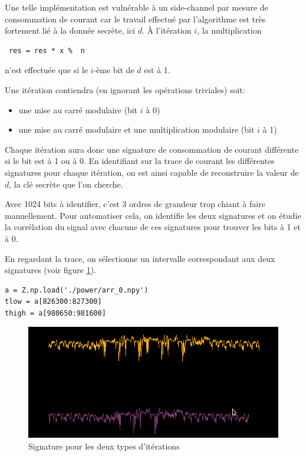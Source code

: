 \documentclass[14pt]{article}
\theoremstyle{definition}
\begin{document}
Une telle implémentation est vulnérable à un side-channel par mesure de consommation de courant car le travail effectué par l'algorithme est très fortement lié à la donnée secrète, ici $d$.
À l'itération $i$, la multiplication 
\begin{verbatim}
 res = res * x %  n
\end{verbatim}
n'est effectuée que si le $i$-ème bit de $d$ est à 1.

Une itération contiendra (en ignorant les opérations triviales) soit:
\begin{itemize}
  \item une mise au carré modulaire (bit $i$ à 0)
  \item une mise au carré modulaire et une multiplication modulaire (bit $i$ à 1)
\end{itemize}


Chaque itération aura donc une signature de consommation de courant différente si le bit est à 1 ou à 0.
En identifiant sur la trace de courant les différentes signatures pour chaque itération, on est ainsi capable de reconstruire la valeur de $d$, la clé secrète que l'on cherche.


Avec 1024 bits à identifier, c'est 3 ordres de grandeur trop chiant à faire manuellement. Pour automatiser cela, on identifie les deux signatures et on étudie la corrélation du signal avec chacune de ces signatures pour trouver les bits à 1 et à 0.


En regardant la trace, on sélectionne un intervalle correspondant aux deux signatures (voir figure \ref{fig:p0_signatures}).
\begin{verbatim}
a = Z.np.load('./power/arr_0.npy')
tlow = a[826300:827300]
thigh = a[980650:981600]
\end{verbatim}



\begin{figure}[H]
\centering
\includegraphics[width=1.0\textwidth]{./screenshots/p0_signatures.png}
  \caption{Signature pour les deux types d'itérations}
  \label{fig:p0_signatures}
\end{figure}
\end{document}
